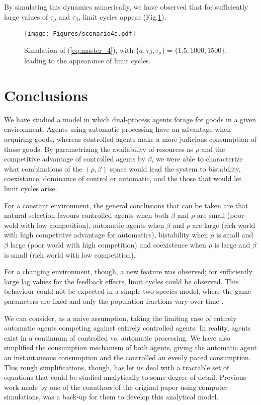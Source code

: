 \documentclass[10pt,a4paper]{article}
\begin{document}
By simulating this dynamics numerically, we have observed that for sufficiently large values of $\tau_{\rho}$ and $\tau_{\beta}$, limit cycles appear (Fig.\ref{fig:scenario4a}).

\begin{figure}[h!]
\centering
\vspace{-2.0cm}
\texttt{[image: Figures/scenario4a.pdf]}
\vspace{-0.4cm}
\caption{Simulation of (\ref{eq:master_4}), with  $\{a,\tau_{\beta},\tau_{\rho}\}=\{1.5,1000,1500\}$, leading to the appearance of limit cycles.}
\label{fig:scenario4a}
\end{figure}

\section{Conclusions}\label{conclusions}

We have studied a model in which dual-process agents forage for goods in a given environment. Agents using automatic processing have an advantage when acquiring goods, whereas
controlled agents make a more judicious consumption of those goods. By parametrizing the availability of resources as $\rho$ and the competitive advantage of controlled agents 
by $\beta$, we were able to characterize what combinations of the $(\rho,\beta)$ space would lead the system to bistability, coexistance, dominance of control or automatic, and
the those that would let limit cycles arise.

For a constant environment, the general conclusions that can be taken are that natural selection favours controlled agents when both $\beta$ and $\rho$ are small (poor wold with 
low competition), automatic agents when $\beta$ and $\rho$ are large (rich world with high competitive advantage for automatics), bistability when $\rho$ is small and 
$\beta$ large (poor world with high competition) and coexistence when $\rho$ is large and $\beta$ is small (rich world with low competition).

For a changing environment, though, a new feature was observed; for sufficiently large lag values for the feedback effects, limit cycles could be observed. This behaviour 
could not be expected in a simple two-species model, where the game parameters are fixed and only the population fractions vary over time \cite{Nowak:book,Hofbauer:book}.

We can consider, as a naive assumption, taking the limiting case of entirely automatic agents competing against entirely controlled agents. In reality, 
agents exist in a continuum of controlled vs. automatic processing. We have also simplified the consumption mechanism of both agents, giving the automatic agent
an instantaneous consumption and the controlled an evenly paced consumption. This rough simplifications, though, has let us deal with a tractable set of equations that
could be studied analytically to some degree of detail. 
Previous work \cite{Tomlin:article} made by one of the coauthors of the original paper \cite{Strogatz:evolutionary} using computer simulations,
was a back-up for them to develop this analytical model. 
\end{document}
